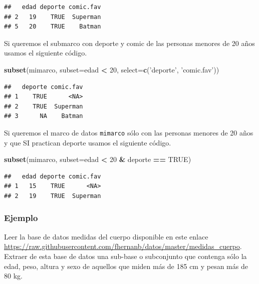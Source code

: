 \documentclass[10pt,]{krantz}
\makeatletter
\newenvironment{Shaded}{\begin{snugshade}}{\end{snugshade}}
\newcommand{\KeywordTok}[1]{\textcolor[rgb]{0.13,0.29,0.53}{\textbf{#1}}}
\newcommand{\DataTypeTok}[1]{\textcolor[rgb]{0.13,0.29,0.53}{#1}}
\newcommand{\DecValTok}[1]{\textcolor[rgb]{0.00,0.00,0.81}{#1}}
\newcommand{\StringTok}[1]{\textcolor[rgb]{0.31,0.60,0.02}{#1}}
\newcommand{\OtherTok}[1]{\textcolor[rgb]{0.56,0.35,0.01}{#1}}
\newcommand{\OperatorTok}[1]{\textcolor[rgb]{0.81,0.36,0.00}{\textbf{#1}}}
\newcommand{\NormalTok}[1]{#1}
\newenvironment{kframe}{%
\medskip{}
\setlength{\fboxsep}{.8em}
 \def\at@end@of@kframe{}%
 \ifinner\ifhmode%
  \def\at@end@of@kframe{\end{minipage}}%
  \begin{minipage}{\columnwidth}%
 \fi\fi%
 \def\FrameCommand##1{\hskip\@totalleftmargin \hskip-\fboxsep
 \colorbox{shadecolor}{##1}\hskip-\fboxsep
     \hskip-\linewidth \hskip-\@totalleftmargin \hskip\columnwidth}%
 \MakeFramed {\advance\hsize-\width
   \@totalleftmargin\z@ \linewidth\hsize
   \@setminipage}}%
 {\par\unskip\endMakeFramed%
 \at@end@of@kframe}
\renewenvironment{Shaded}{\begin{kframe}}{\end{kframe}}
\makeatother
\begin{document}
\begin{verbatim}
##   edad deporte comic.fav
## 2   19    TRUE  Superman
## 5   20    TRUE    Batman
\end{verbatim}

Si queremos el submarco con deporte y comic de las personas menores de
20 años usamos el siguiente código.

\begin{Shaded}
\begin{Highlighting}[]
\KeywordTok{subset}\NormalTok{(mimarco, }\DataTypeTok{subset=}\NormalTok{edad }\OperatorTok{<}\StringTok{ }\DecValTok{20}\NormalTok{, }\DataTypeTok{select=}\KeywordTok{c}\NormalTok{(}\StringTok{'deporte'}\NormalTok{, }\StringTok{'comic.fav'}\NormalTok{))}
\end{Highlighting}
\end{Shaded}

\begin{verbatim}
##   deporte comic.fav
## 1    TRUE      <NA>
## 2    TRUE  Superman
## 3      NA    Batman
\end{verbatim}

Si queremos el marco de datos \texttt{mimarco} sólo con las personas
menores de 20 años y que SI practican deporte usamos el siguiente
código.

\begin{Shaded}
\begin{Highlighting}[]
\KeywordTok{subset}\NormalTok{(mimarco, }\DataTypeTok{subset=}\NormalTok{edad }\OperatorTok{<}\StringTok{ }\DecValTok{20} \OperatorTok{&}\StringTok{ }\NormalTok{deporte }\OperatorTok{==}\StringTok{ }\OtherTok{TRUE}\NormalTok{)}
\end{Highlighting}
\end{Shaded}

\begin{verbatim}
##   edad deporte comic.fav
## 1   15    TRUE      <NA>
## 2   19    TRUE  Superman
\end{verbatim}

\subsubsection*{Ejemplo}\label{ejemplo-4}

Leer la base de datos medidas del cuerpo disponible en este enlace
\url{https://raw.githubusercontent.com/fhernanb/datos/master/medidas_cuerpo}.
Extraer de esta base de datos una sub-base o subconjunto que contenga
sólo la edad, peso, altura y sexo de aquellos que miden más de 185 cm y
pesan más de 80 kg.
\end{document}
